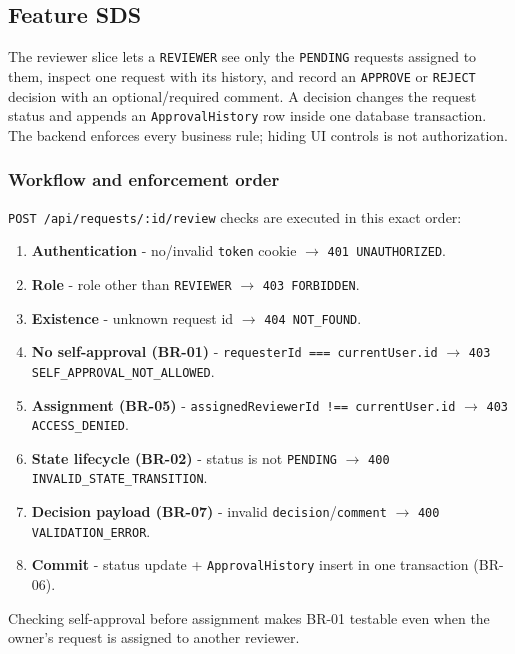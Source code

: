 \documentclass[11pt,a4paper]{article}
\begin{document}
\subsection{Feature SDS}

The reviewer slice lets a \texttt{REVIEWER} see only the \texttt{PENDING} requests assigned to them, inspect one request with its history, and record an \texttt{APPROVE} or \texttt{REJECT} decision with an optional/required comment. A decision changes the request status and appends an \texttt{ApprovalHistory} row inside one database transaction. The backend enforces every business rule; hiding UI controls is not authorization.\\

\subsubsection{Workflow and enforcement order}

\texttt{POST /api/requests/:id/review} checks are executed in this exact order:\\

\begin{enumerate}[leftmargin=*,itemsep=2pt,topsep=2pt]
  \item \textbf{Authentication} - no/invalid \texttt{token} cookie $\rightarrow$ \texttt{401 UNAUTHORIZED}.
  \item \textbf{Role} - role other than \texttt{REVIEWER} $\rightarrow$ \texttt{403 FORBIDDEN}.
  \item \textbf{Existence} - unknown request id $\rightarrow$ \texttt{404 NOT\_FOUND}.
  \item \textbf{No self-approval (BR-01)} - \texttt{requesterId === currentUser.id} $\rightarrow$ \texttt{403 SELF\_APPROVAL\_NOT\_ALLOWED}.
  \item \textbf{Assignment (BR-05)} - \texttt{assignedReviewerId !== currentUser.id} $\rightarrow$ \texttt{403 ACCESS\_DENIED}.
  \item \textbf{State lifecycle (BR-02)} - status is not \texttt{PENDING} $\rightarrow$ \texttt{400 INVALID\_STATE\_TRANSITION}.
  \item \textbf{Decision payload (BR-07)} - invalid \texttt{decision}/\texttt{comment} $\rightarrow$ \texttt{400 VALIDATION\_ERROR}.
  \item \textbf{Commit} - status update + \texttt{ApprovalHistory} insert in one transaction (BR-06).
\end{enumerate}
Checking self-approval before assignment makes BR-01 testable even when the owner's request is assigned to another reviewer.\\
\end{document}
